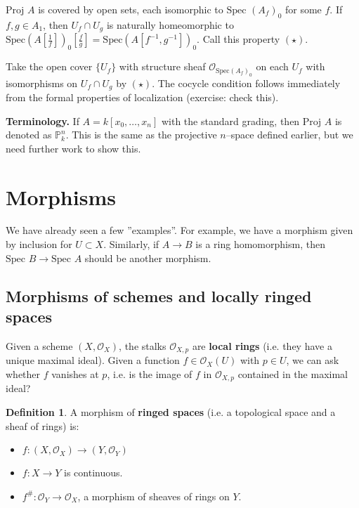 \documentclass{article}
\theoremstyle{definition}
\newtheorem{defn}{Definition}[section]
\begin{document}
$\text{Proj }A$ is covered by open sets, each isomorphic to $\text{Spec }(A_f)_0$ for some $f$. If $f, g \in A_1$, then $U_f \cap U_g$ is naturally homeomorphic to $\text{Spec}(A[\frac{1}{f}])_0[\frac{f}{g}] = \text{Spec}(A[f^{-1},g^{-1}])_0$. Call this property $(\star)$. 
\vspace{1mm}
 
Take the open cover $\{U_f\}$ with structure sheaf $\mathcal{O}_{\text{Spec}(A_f)_0}$ on each $U_f$ with isomorphisms on $U_f \cap U_g$ by $(\star)$. The cocycle condition follows immediately from the formal properties of localization (exercise: check this).
\vspace{1mm}
 
\textbf{Terminology.} If $A = k[x_0,\ldots,x_n]$ with the standard grading, then $\text{Proj }A$ is denoted as $\mathbb{P}_k^n$. This is the same as the projective $n$--space defined earlier, but we need further work to show this.

\section{Morphisms}

We have already seen a few ''examples''. For example, we have a morphism given by inclusion for $U \subset X$. Similarly, if $A \to B$ is a ring homomorphism, then $\text{Spec }B \to \text{Spec }A$ should be another morphism.

\subsection{Morphisms of schemes and locally ringed spaces}

Given a scheme $(X, \mathcal{O}_X)$, the stalks $\mathcal{O}_{X,p}$ are \textbf{local rings} (i.e. they have a unique maximal ideal). Given a function $f \in \mathcal{O}_X(U)$ with $p \in U$, we can ask whether $f$ vanishes at $p$, i.e. is the image of $f$ in $\mathcal{O}_{X,p}$ contained in the maximal ideal?

\begin{defn}
    A morphism of \textbf{ringed spaces} (i.e. a topological space and a sheaf of rings) is:
    \begin{itemize}
        \item $f: (X, \mathcal{O}_X) \to (Y, \mathcal{O}_Y)$
        \item $f : X \to Y$ is continuous.
        \item $f^\# : \mathcal{O}_Y \to \mathcal{O}_X$, a morphism of sheaves of rings on $Y$.
    \end{itemize}
\end{defn}
\end{document}
